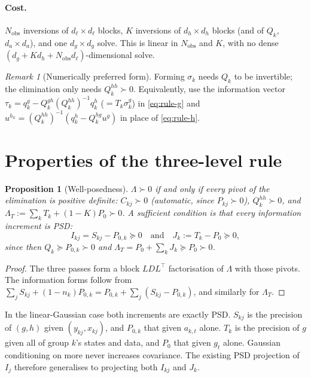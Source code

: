 \documentclass[11pt]{article}
\newtheorem{proposition}[theorem]{Proposition}
\theoremstyle{definition}
\theoremstyle{remark}
\newtheorem{remark}{Remark}
\newcommand{\T}{\top}
\newcommand{\hk}{h_k}
\begin{document}
\paragraph{Cost.} $N_\text{obs}$ inversions of $d_\ell\times d_\ell$ blocks,
$K$ inversions of $d_h\times d_h$ blocks (and of $Q_k$, $d_a\times d_a$), and
one $d_g\times d_g$ solve. This is linear in $N_\text{obs}$ and $K$, with no
dense $(d_g+Kd_h+N_\text{obs}d_\ell)$-dimensional solve.

\begin{remark}[Numerically preferred form]
Forming $\sigma_k$ needs $Q_k$ to be invertible; the elimination only needs
$Q^{hh}_k\succ0$. Equivalently, use the information vector
$\tau_k=q^g_k-Q^{gh}_k(Q^{hh}_k)^{-1}q^h_k$ ($=T_k\sigma^g_k$) in \eqref{eq:rule-g}
and $u^{\hk}=(Q^{hh}_k)^{-1}(q^h_k-Q^{hg}_ku^g)$ in place of \eqref{eq:rule-h}.
\end{remark}

\section{Properties of the three-level rule}\label{sec:properties}

\begin{proposition}[Well-posedness]\label{prop:pd}
$\Lambda\succ0$ if and only if every pivot of the elimination is positive definite:
$C_{kj}\succ0$ (automatic, since $P_{kj}\succ0$), $Q^{hh}_k\succ0$, and
$\Lambda_T:=\sum_kT_k+(1-K)P_0\succ0$. A sufficient condition is that every
information increment is PSD:
\begin{equation}\label{eq:info-psd}
I_{kj}=S_{kj}-P_{0,k}\succeq0\quad\text{and}\quad J_k:=T_k-P_0\succeq0,
\end{equation}
since then $Q_k\succeq P_{0,k}\succ0$ and $\Lambda_T=P_0+\sum_kJ_k\succeq P_0\succ0$.
\end{proposition}
\begin{proof}
The three passes form a block $LDL^\T$ factorisation of $\Lambda$ with those
pivots. The information forms follow from $\sum_jS_{kj}+(1-n_k)P_{0,k}=P_{0,k}+\sum_j(S_{kj}-P_{0,k})$,
and similarly for $\Lambda_T$.
\end{proof}
In the linear-Gaussian case both increments are exactly PSD. $S_{kj}$ is the
precision of $(g,h)$ given $(y_{kj},x_{kj})$, and $P_{0,k}$ that given
$a_{k,t}$ alone. $T_k$ is the precision of $g$ given all of group $k$'s states and
data, and $P_0$ that given $g_t$ alone. Gaussian conditioning on more never
increases covariance. The existing PSD projection of $I_j$ therefore generalises
to projecting both $I_{kj}$ and $J_k$.
\end{document}
